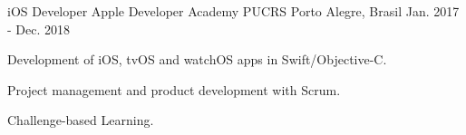 \begin{cventries}
  \cventry
    {iOS Developer}
    {Apple Developer Academy PUCRS}
    {Porto Alegre, Brasil}
    {Jan. 2017 - Dec. 2018}
    {
      \begin{cvitems}
        \item {Development of iOS, tvOS and watchOS apps in Swift/Objective-C.}
        \item {Project management and product development with Scrum.}
        \item {Challenge-based Learning.}
      \end{cvitems}
    }
\end{cventries}

